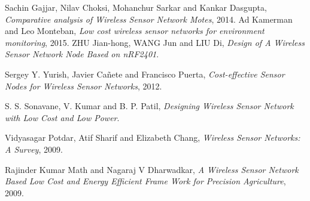 \documentclass[a4paper,12pt,oneside]{book}
\begin{document}
\begin{thebibliography}{li}
Sachin Gajjar, Nilav Choksi, Mohanchur Sarkar and Kankar Dasgupta,
{\em Comparative analysis of
Wireless Sensor Network Motes},
2014.
Ad Kamerman and Leo Monteban,
{\em Low cost wireless sensor networks for environment monitoring}, 2015.
ZHU Jian-hong, WANG Jun and LIU Di,
{\em Design of A Wireless Sensor Network Node Based on nRF2401}.

Sergey Y. Yurish, Javier Cañete and Francisco Puerta,
{\em Cost-effective Sensor Nodes for Wireless Sensor Networks}, 2012.

S. S. Sonavane, V. Kumar and B. P. Patil,
{\em Designing Wireless Sensor Network with
Low Cost and Low Power}.

Vidyasagar Potdar, Atif Sharif and Elizabeth Chang,
{\em Wireless Sensor Networks: A Survey}, 2009.

Rajinder Kumar Math and Nagaraj V Dharwadkar,
{\em A Wireless Sensor Network Based Low Cost and
Energy Efficient Frame Work for Precision
Agriculture}, 2009.
 
\end{thebibliography}
\end{document}
